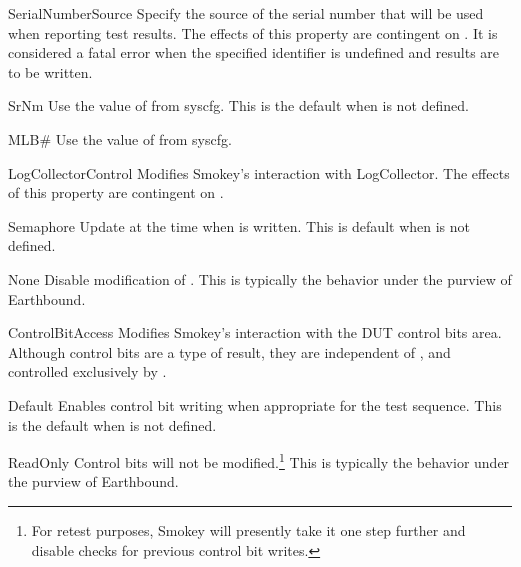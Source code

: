 \begin{Property}
	\item[SerialNumberSource] Specify the source of the serial number that
	will be used when reporting test results.  The effects of this property
	are contingent on .  It is considered a fatal
	error when the specified identifier is undefined and results are to be
	written.

	\begin{Definition}

		\item[SrNm] Use the value of  from syscfg.  This is
		the default when  is not defined.

		\item[MLB\#] Use the value of  from syscfg.

	\end{Definition}

	\item[LogCollectorControl] Modifies Smokey's interaction with
	LogCollector.  The effects of this property are contingent on
	\prop{ResultsBehavior}.

	\begin{Definition}

		\item[Semaphore] Update
		 at the time when
		 is written.  This is default when
		 is not defined.

		\item[None] Disable modification of
		.  This is typically
		the behavior under the purview of Earthbound.

	\end{Definition}

	\item[ControlBitAccess] Modifies Smokey's interaction with the DUT
	control bits area.  Although control bits are a type of result, they
	are independent of , and controlled exclusively
	by \prop{ControlBitAccess}.

	\begin{Definition}

		\item[Default] Enables control bit writing when appropriate for
		the test sequence.  This is the default when
		 is not defined.

		\item[ReadOnly] Control bits will not be modified.\footnote{For
		retest purposes, Smokey will presently take it one step further
		and disable checks for previous control bit writes.} This is
		typically the behavior under the purview of Earthbound.

	\end{Definition}

\end{Property}

